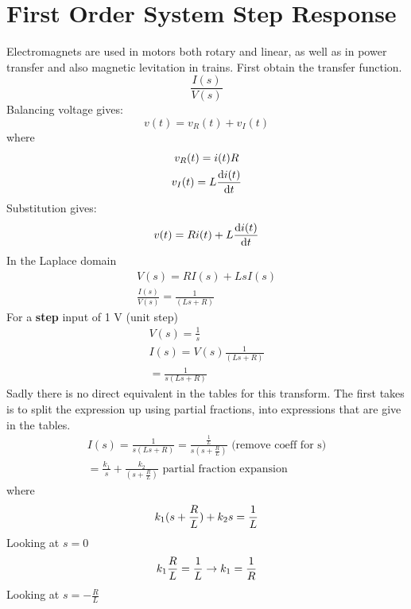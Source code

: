 \documentclass[class=report, crop=false, 12pt,a4paper, tikz, border=4mm]{standalone}
\begin{document}
\section{First Order System Step Response}
Electromagnets are used in motors both rotary and linear, as well as in power transfer and also magnetic levitation in trains. First obtain the transfer function.
\begin{equation}
  \frac{I(s)}{V(s)}
\end{equation}
Balancing voltage gives:
\begin{equation}
  v(t) = v_R(t) + v_I(t)
\end{equation}
where
\begin{gather}
  v_R(t) = i (t) R\\
  v_I (t) = L\frac{\dif i(t)}{\dif t}
\end{gather}
Substitution gives:
\begin{equation}
  v(t) = Ri(t) + L\frac{\dif i(t)}{\dif t}
\end{equation}
In the Laplace domain
\begin{gather}
  V(s) = RI(s) + LsI(s)\\
  \frac{I(s)}{V(s)} = \frac{1}{(Ls + R)}
\end{gather}
For a \textbf{step} input of 1 \si{\volt} (unit step)
\begin{gather}
  V(s) = \frac{1}{s}\\
  I(s) = V(s) \frac{1}{(Ls + R)}\\
  =  \frac{1}{s(Ls + R)}
\end{gather}
Sadly there is no direct equivalent in the tables for this transform. The first takes is to split the expression up using partial fractions, into expressions that are give in the tables.
\begin{gather}
  I(s) = \frac{1}{s(Ls + R)} = \frac{\frac{1}{L}}{s(s+\frac{R}{L})} \textrm{ (remove coeff for s)}\\
  = \frac{k_1}{s} + \frac{k_2}{(s + \frac{R}{L})} \textrm{ partial fraction expansion}
\end{gather}
where
\begin{equation}
  k_1 (s + \frac{R}{L}) + k_2 s = \frac{1}{L}\\
\end{equation}
Looking at $s=0$
\begin{equation}
  k_1 \frac{R}{L} = \frac{1}{L} \rightarrow k_1 = \frac{1}{R}\\
\end{equation} 
Looking at $s= -\frac{R}{L}$
\end{document}

